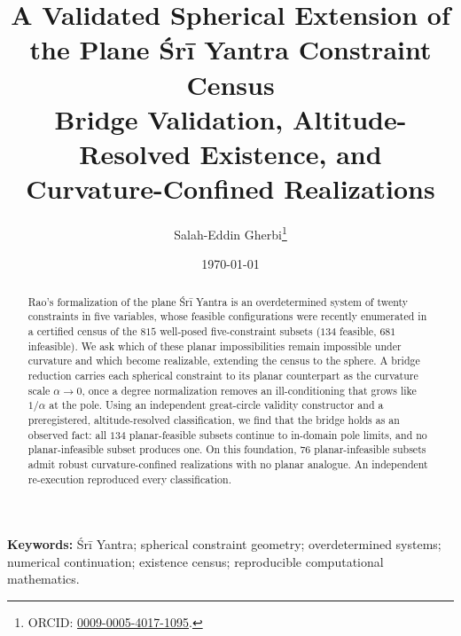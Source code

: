 \documentclass[11pt]{article}
\title{A Validated Spherical Extension of the Plane Śrī Yantra Constraint Census\\[4pt]
\large Bridge Validation, Altitude-Resolved Existence, and Curvature-Confined Realizations}
\author{Salah-Eddin Gherbi\thanks{ORCID: \href{https://orcid.org/0009-0005-4017-1095}{0009-0005-4017-1095}.}}
\date{\today}
\begin{document}
\maketitle
\begin{abstract}
Rao's formalization of the plane Śrī Yantra is an overdetermined system of
twenty constraints in five variables, whose feasible configurations were
recently enumerated in a certified census of the $815$ well-posed five-constraint subsets ($134$ feasible, $681$ infeasible). We ask which of these planar impossibilities remain impossible under curvature and which become realizable, extending the census to the sphere. A bridge reduction carries each spherical constraint to its planar counterpart as the curvature scale $\alpha\to 0$, once a degree normalization removes an ill-conditioning that grows like $1/\alpha$ at the pole. Using an independent great-circle validity constructor and a preregistered, altitude-resolved classification, we find that the bridge holds as an observed fact: all $134$ planar-feasible subsets continue to in-domain pole limits, and no planar-infeasible subset produces one. On this foundation, $76$ planar-infeasible subsets admit robust curvature-confined realizations with no planar analogue. An independent re-execution reproduced every classification.
\end{abstract}

\noindent\textbf{Keywords:} Śrī Yantra; spherical constraint geometry;
overdetermined systems; numerical continuation; existence census; reproducible computational mathematics.

\end{document}
